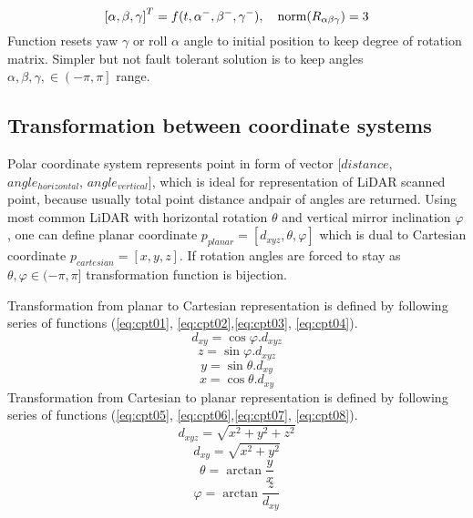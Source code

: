 \begin{equation}
    \left [ \alpha, \beta ,\gamma \right ]^T = f(t,\alpha^-,\beta^-,\gamma^-), \quad \textnormal{norm}(R_{\alpha\beta\gamma})=3
\end{equation}
Function resets yaw $\gamma$ or roll $\alpha$ angle to initial position to keep degree of rotation matrix. Simpler but not fault tolerant solution is to keep angles $\alpha,\beta,\gamma, \in \left (  -\pi,\pi\right ]$ range.

\subsection*{Transformation between coordinate systems}
\noindent Polar coordinate system represents point in form of vector $[distance$, $angle_{horizontal}$, $angle_{vertical}]$, which is ideal for representation of LiDAR scanned point, because usually total point distance andpair of angles are returned. Using most common LiDAR with horizontal rotation $\theta$ and vertical mirror inclination $\varphi$, one can define planar coordinate $p_{planar} = [d_{xyz},\theta,\varphi]$ which is dual to Cartesian coordinate $p_{cartesian} = [x,y,z]$. If rotation angles are forced to stay as $\theta,\varphi\in(-\pi,\pi]$ transformation function is bijection.

Transformation from planar to Cartesian representation is defined by following series of functions (\ref{eq:cpt01}, \ref{eq:cpt02},\ref{eq:cpt03}, \ref{eq:cpt04}).
\begin{equation}\label{eq:cpt01}
    d_{xy} = \cos\varphi.d_{xyz}
\end{equation}
\begin{equation}\label{eq:cpt02}
    z = \sin\varphi.d_{xyz}
\end{equation}
\begin{equation}\label{eq:cpt03}
    y = \sin\theta.d_{xy}
\end{equation}
\begin{equation}\label{eq:cpt04}
    x = \cos\theta.d_{xy}
\end{equation}
Transformation from Cartesian to planar representation is defined by following series of functions (\ref{eq:cpt05}, \ref{eq:cpt06},\ref{eq:cpt07}, \ref{eq:cpt08}).
\begin{equation}\label{eq:cpt05}
    d_{xyz} = \sqrt{x^2+y^2+z^2}    
\end{equation}
\begin{equation}\label{eq:cpt06}
    d_{xy} = \sqrt{x^2+y^2}    
\end{equation}
\begin{equation}\label{eq:cpt07}
    \theta = \arctan\frac{y}{x}
\end{equation}
\begin{equation}\label{eq:cpt08}
    \varphi= \arctan\frac{z}{d_{xy}}
\end{equation}

